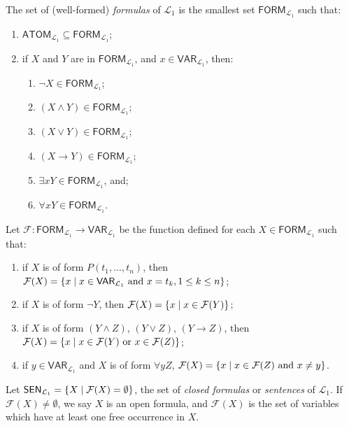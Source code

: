 \begin{defn}
The set of (well-formed) \textit{formulas} of $\mathcal{L}_1$ is the smallest set $\mathsf{FORM}_{\mathcal{L}_1}$ such that:
	\begin{enumerate}
		\item $\mathsf{ATOM}_{\mathcal{L}_1} \subseteq \mathsf{FORM}_{\mathcal{L}_1}$;
		\item if $X$ and $Y$ are in $\mathsf{FORM}_{\mathcal{L}_1}$, and $x \in \mathsf{VAR}_{\mathcal{L}_1}$, then:
		\begin{enumerate}
			\item $\neg X \in \mathsf{FORM}_{\mathcal{L}_1}$;
			\item $(X \wedge Y) \in \mathsf{FORM}_{\mathcal{L}_1}$;
			\item $(X \vee Y) \in \mathsf{FORM}_{\mathcal{L}_1}$; 
			\item $(X \rightarrow Y) \in \mathsf{FORM}_{\mathcal{L}_1}$;
			\item $\exists x Y \in \mathsf{FORM}_{\mathcal{L}_1}$, and;
			\item $\forall x Y \in \mathsf{FORM}_{\mathcal{L}_1}$.
		\end{enumerate}
	\end{enumerate}
\end{defn}

\begin{defn}
Let $\mathcal{F}: \mathsf{FORM}_{\mathcal{L}_1} \to \mathsf{VAR}_{\mathcal{L}_1}$ be the function defined for each $X \in \mathsf{FORM}_{\mathcal{L}_1}$ such that:

\begin{enumerate}
	\item if $X$ is of form $P(t_1, ..., t_n)$, then $\mathcal{F}(X)=\{x \mid x \in \mathsf{VAR}_{\mathcal{L}_1}\text{ and } x=t_k, 1 \leq k \leq n\}$;
	\item if $X$ is of form $\neg Y$, then $\mathcal{F}(X)=\{x \mid x \in \mathcal{F}(Y)\}$;
	\item if $X$ is of form $(Y \wedge Z)$, $(Y \vee Z)$, $(Y \rightarrow Z)$, then $\mathcal{F}(X)=\{x \mid x \in \mathcal{F}(Y) \text{ or } x \in \mathcal{F}(Z)\}$;
	\item if $y \in \mathsf{VAR}_{\mathcal{L}_1}$ and $X$ is of form $\forall y Z$, $\mathcal{F}(X)=\{x \mid x\in \mathcal{F}(Z) \text{ and } x\neq y\}$. 
	\end{enumerate}

Let $\mathsf{SEN}_{\mathcal{L}_1}=\{X \mid \mathcal{F}(X)=\emptyset\}$, the set of \textit{closed formulas} or \textit{sentences} of $\mathcal{L}_1$. If $\mathcal{F}(X)\neq \emptyset$, we say $X$ is an open formula, and $\mathcal{F}(X)$ is the set of variables which have at least one free occurrence in $X$. 
\end{defn}

